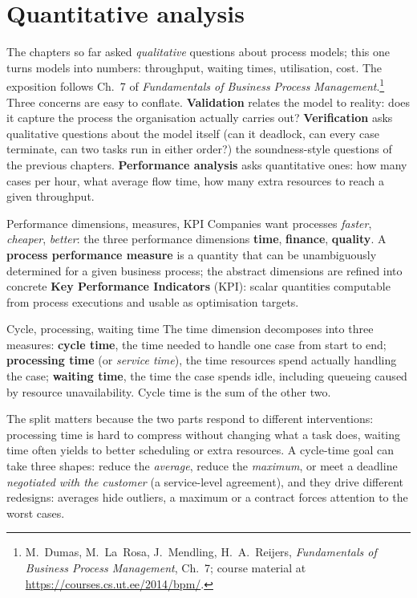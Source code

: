 \section{Quantitative analysis}

The chapters so far asked \emph{qualitative} questions about process models; this one turns models into numbers: throughput, waiting times, utilisation, cost. The exposition follows Ch.~7 of \emph{Fundamentals of Business Process Management}.\footnote{M.~Dumas, M.~La~Rosa, J.~Mendling, H.~A.~Reijers, \emph{Fundamentals of Business Process Management}, Ch.~7; course material at \url{https://courses.cs.ut.ee/2014/bpm/}.} Three concerns are easy to conflate. \textbf{Validation} relates the model to reality: does it capture the process the organisation actually carries out? \textbf{Verification} asks qualitative questions about the model itself (can it deadlock, can every case terminate, can two tasks run in either order?) the soundness-style questions of the previous chapters. \textbf{Performance analysis} asks quantitative ones: how many cases per hour, what average flow time, how many extra resources to reach a given throughput.

\begin{definitionbox}{Performance dimensions, measures, KPI}
Companies want processes \emph{faster}, \emph{cheaper}, \emph{better}: the three performance dimensions \textbf{time}, \textbf{finance}, \textbf{quality}. A \textbf{process performance measure} is a quantity that can be unambiguously determined for a given business process; the abstract dimensions are refined into concrete \textbf{Key Performance Indicators} (KPI): scalar quantities computable from process executions and usable as optimisation targets.
\end{definitionbox}

\begin{definitionbox}{Cycle, processing, waiting time}
The time dimension decomposes into three measures: \textbf{cycle time}, the time needed to handle one case from start to end; \textbf{processing time} (or \emph{service time}), the time resources spend actually handling the case; \textbf{waiting time}, the time the case spends idle, including queueing caused by resource unavailability. Cycle time is the sum of the other two.
\end{definitionbox}
The split matters because the two parts respond to different interventions: processing time is hard to compress without changing what a task does, waiting time often yields to better scheduling or extra resources. A cycle-time goal can take three shapes: reduce the \emph{average}, reduce the \emph{maximum}, or meet a deadline \emph{negotiated with the customer} (a service-level agreement), and they drive different redesigns: averages hide outliers, a maximum or a contract forces attention to the worst cases.


